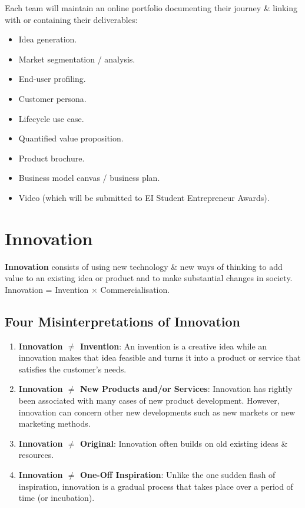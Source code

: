 \documentclass[a4paper,11pt]{article}
\begin{document}
Each team will maintain an online portfolio documenting their journey \& linking with or containing their deliverables:
\begin{multicols}{2}
\begin{itemize}
    \item   Idea generation.
    \item   Market segmentation / analysis.
    \item   End-user profiling.
    \item   Customer persona.
    \item   Lifecycle use case.
    \item   Quantified value proposition.
    \item   Product brochure.
    \item   Business model canvas / business plan.
    \item   Video (which will be submitted to EI Student Entrepreneur Awards).
\end{itemize}
\end{multicols}

\section{Innovation}
\textbf{Innovation} consists of using new technology \& new ways of thinking to add value to an existing idea or
product and to make substantial changes in society.
Innovation = Invention $\times$ Commercialisation.

\subsection{Four Misinterpretations of Innovation}
\begin{enumerate}
    \item   \textbf{Innovation $\neq$ Invention}: An invention is a creative idea while an innovation makes that idea 
            feasible and turns it into a product or service that satisfies the customer's needs.

    \item   \textbf{Innovation $\neq$ New Products and/or Services}: Innovation has rightly been associated with many 
            cases of new product development.
            However, innovation can concern other new developments such as new markets or new marketing methods.

    \item   \textbf{Innovation $\neq$ Original}: Innovation often builds on old existing ideas \& resources.
    
    \item   \textbf{Innovation $\neq$ One-Off Inspiration}: Unlike the one sudden flash of inspiration, innovation
            is a gradual process that takes place over a period of time (or incubation).
\end{enumerate}
\end{document}
